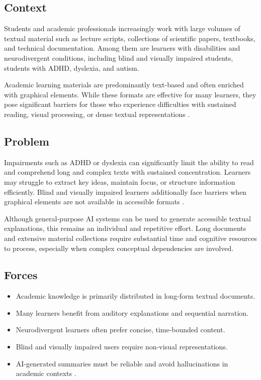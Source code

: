 \patternSeven

\subsection*{Context}

Students and academic professionals increasingly work with large volumes of textual material such as lecture scripts, collections of scientific papers, textbooks, and technical documentation. Among them are learners with disabilities and neurodivergent conditions, including blind and visually impaired students, students with ADHD, dyslexia, and autism.

Academic learning materials are predominantly text-based and often enriched with graphical elements. While these formats are effective for many learners, they pose significant barriers for those who experience difficulties with sustained reading, visual processing, or dense textual representations \cite{burgstahler2015,al-azawei2016}.

\subsection*{Problem}
\begin{itshape}
Impairments such as ADHD or dyslexia can significantly limit the ability to read and comprehend long and complex texts with sustained concentration. Learners may struggle to extract key ideas, maintain focus, or structure information efficiently. Blind and visually impaired learners additionally face barriers when graphical elements are not available in accessible formats \cite{w3c2023}.

Although general-purpose AI systems can be used to generate accessible textual explanations, this remains an individual and repetitive effort. Long documents and extensive material collections require substantial time and cognitive resources to process, especially when complex conceptual dependencies are involved.
\end{itshape}

\subsection*{Forces}

\begin{itemize}
    \item Academic knowledge is primarily distributed in long-form textual documents.
    \item Many learners benefit from auditory explanations and sequential narration.
    \item Neurodivergent learners often prefer concise, time-bounded content.
    \item Blind and visually impaired users require non-visual representations.
    \item AI-generated summaries must be reliable and avoid hallucinations in academic contexts \cite{shneiderman2020}.
\end{itemize}

